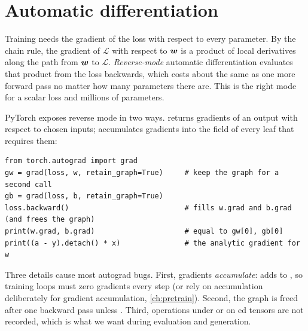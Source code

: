 \section{Automatic differentiation}\label{sec:pytorch:autograd}

Training needs the gradient of the loss with respect to every parameter. By the chain rule, the gradient
of $\mathcal{L}$ with respect to $\bm{w}$ is a product of local derivatives along the path from $\bm{w}$
to $\mathcal{L}$. \emph{Reverse-mode} automatic differentiation evaluates that product from the loss
backwards, which costs about the same as one more forward pass no matter how many parameters there are.
This is the right mode for a scalar loss and millions of parameters.

PyTorch exposes reverse mode in two ways.  returns gradients of an output with
respect to chosen inputs;  accumulates gradients into the  field of every leaf
that requires them:

\begin{lstlisting}[caption={Two ways to get gradients from the graph of Listing~\ref{lst:pytorch:logreg}.},label={lst:pytorch:grad}]
from torch.autograd import grad
gw = grad(loss, w, retain_graph=True)     # keep the graph for a second call
gb = grad(loss, b, retain_graph=True)
loss.backward()                           # fills w.grad and b.grad (and frees the graph)
print(w.grad, b.grad)                     # equal to gw[0], gb[0]
print((a - y).detach() * x)               # the analytic gradient for w
\end{lstlisting}

Three details cause most autograd bugs. First, gradients \emph{accumulate}:  adds to
, so training loops must zero gradients every step (or rely on accumulation deliberately for
gradient accumulation, \cref{ch:pretrain}). Second, the graph is freed after one backward pass unless
. Third, operations under  or on ed tensors are not
recorded, which is what we want during evaluation and generation.

